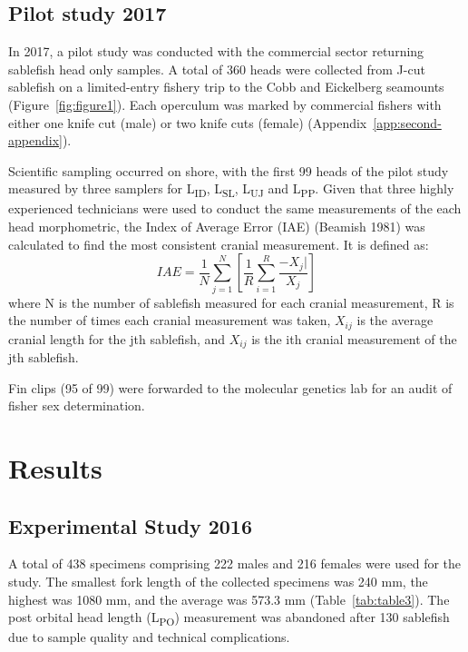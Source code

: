 \documentclass[12pt]{article}\usepackage[]{graphicx}\usepackage[]{color}
\begin{document}
\hypertarget{pilot-study-2017}{%
\subsection{Pilot study 2017}\label{pilot-study-2017}}

In 2017, a pilot study was conducted with the commercial sector returning sablefish head only samples. A total of 360 heads were collected from J-cut sablefish on a limited-entry fishery trip to the Cobb and Eickelberg seamounts (Figure~\ref{fig:figure1}). Each operculum was marked by commercial fishers with either one knife cut (male) or two knife cuts (female) (Appendix~\ref{app:second-appendix}).

Scientific sampling occurred on shore, with the first 99 heads of the pilot study measured by three samplers for L\textsubscript{ID}, L\textsubscript{SL}, L\textsubscript{UJ} and L\textsubscript{PP}. Given that three highly experienced technicians were used to conduct the same measurements of the each head morphometric, the Index of Average Error (IAE) (Beamish 1981) was calculated to find the most consistent cranial measurement. It is defined as: \[
IAE=\frac{1}{N}\sum_{j = 1}^{N}\left[\frac{1}{R}\sum_{i = 1}^{R}\frac{ - X_j|}{X_j}\right]
\] where N is the number of sablefish measured for each cranial measurement, R is the number of times each cranial measurement was taken, \(X_{ij}\) is the average cranial length for the jth sablefish, and \(X_{ij}\) is the ith cranial measurement of the jth sablefish.

Fin clips (95 of 99) were forwarded to the molecular genetics lab for an audit of fisher sex determination.

\hypertarget{results}{%
\section{Results}\label{results}}

\hypertarget{experimental-study-2016-1}{%
\subsection{Experimental Study 2016}\label{experimental-study-2016-1}}

A total of 438 specimens comprising 222 males and 216 females were used for the study. The smallest fork length of the collected specimens was 240 mm, the highest was 1080 mm, and the average was 573.3 mm (Table~\ref{tab:table3}). The post orbital head length (L\textsubscript{PO}) measurement was abandoned after 130 sablefish due to sample quality and technical complications.
\end{document}
